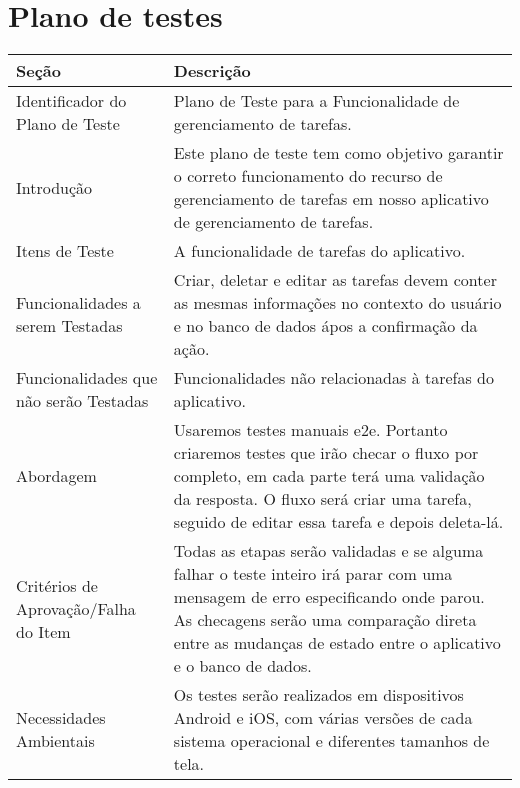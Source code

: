 \chapter{Plano de testes}

    \begin{tabularx}{\textwidth}{|X|X|}
        \hline
        Seção & Descrição \\
        \hline
        Identificador do Plano de Teste & Plano de Teste para a Funcionalidade de gerenciamento de tarefas. \\
        \hline
        Introdução & Este plano de teste tem como objetivo garantir o correto funcionamento do recurso de gerenciamento de tarefas em nosso aplicativo de gerenciamento de tarefas. \\
        \hline
        Itens de Teste & A funcionalidade de tarefas do aplicativo. \\
        \hline
        Funcionalidades a serem Testadas & Criar, deletar e editar as tarefas devem conter as mesmas informações no contexto do usuário e no banco de dados ápos a confirmação da ação. \\
        \hline
        Funcionalidades que não serão Testadas & Funcionalidades não relacionadas à tarefas do aplicativo. \\
        \hline
        Abordagem & Usaremos testes manuais \acrshort{e2e}. Portanto criaremos testes que irão checar o fluxo por completo, em cada parte terá uma validação da resposta. O fluxo será criar uma tarefa, seguido de editar essa tarefa e depois deleta-lá. \\
        \hline
        Critérios de Aprovação/Falha do Item & Todas as etapas serão validadas e se alguma falhar o teste inteiro irá parar com uma mensagem de erro especificando onde parou. As checagens serão uma comparação direta entre as mudanças de estado entre o aplicativo e o banco de dados. \\
        \hline
        Necessidades Ambientais & Os testes serão realizados em dispositivos Android e iOS, com várias versões de cada sistema operacional e diferentes tamanhos de tela. \\
        \hline
        \end{tabularx}

